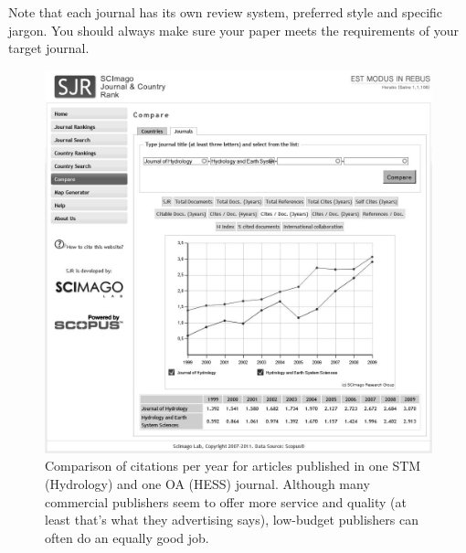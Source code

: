 \documentclass[graybox,envcountchap,sectrefs,UStrade]{svmono}
\begin{document}
Note that each journal has its own review system, preferred style and specific jargon. You should always make sure your paper meets the requirements of your target journal. \par

\begin{figure}[!htb]
\begin{center}
  \includegraphics[width=\textwidth]{Fig_SCImago_screenshot.jpg}
\caption{Comparison of citations per year for articles published in one STM (Hydrology) and one OA (HESS) journal. Although many commercial publishers seem to offer more service and quality (at least that's what they advertising says), low-budget publishers can often do an equally good job.} \label{Fig:SCImago_screenshot}
\end{center}
\end{figure}
\end{document}
